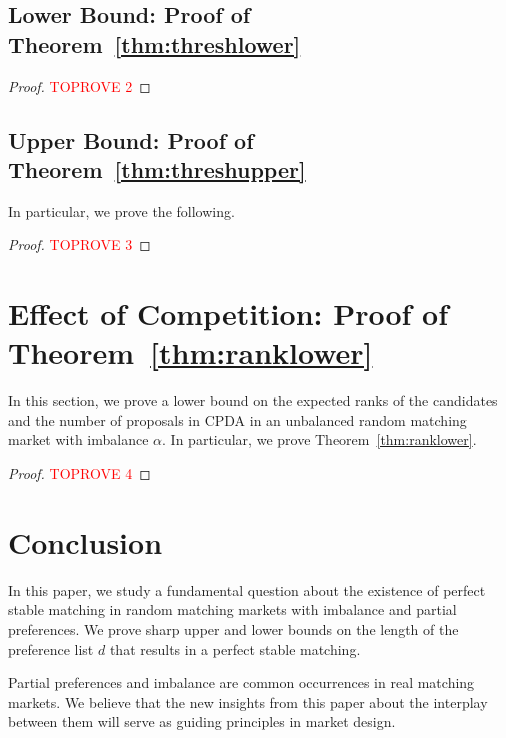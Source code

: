\documentclass[11pt]{amsart}
\begin{document}
\subsection{Lower Bound: Proof of Theorem~\ref{thm:threshlower}}\label{sec:lower}



\begin{proof}\textcolor{red}{TOPROVE 2}\end{proof}


\subsection{Upper Bound: Proof of Theorem~\ref{thm:threshupper}}\label{sec:upper}
In particular, we prove the following.



\begin{proof}\textcolor{red}{TOPROVE 3}\end{proof}



 \section{Effect of Competition: Proof of Theorem~\ref{thm:ranklower}}\label{sec:expected}

In this section, we prove a lower bound on the expected ranks of the candidates and the number of proposals in CPDA in an unbalanced random matching market with imbalance $\alpha$.  In particular, we prove Theorem~\ref{thm:ranklower}.


\begin{proof}\textcolor{red}{TOPROVE 4}\end{proof}






 \section{Conclusion}\label{sec:conclusion}
In this paper, we study a fundamental question about the existence of perfect stable matching in random matching markets with imbalance and partial preferences.  We prove sharp upper and lower bounds on the length of the preference list $d$ that results in a perfect stable matching.  



Partial preferences and imbalance are common occurrences in real matching markets.
We believe that the new insights from this paper about the interplay between them will serve as guiding principles in market design.
\end{document}
